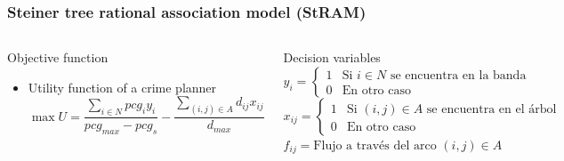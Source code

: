 \documentclass[aspectratio=169]{beamer}
\begin{document}
\begin{frame}
\frametitle{Steiner tree rational association model (StRAM)}
\begin{columns}
  \begin{block}{Objective function}
    \begin{itemize}
    \footnotesize
      \item Utility function of a crime planner
      \begin{equation*}
        \max U = \frac{\sum_{i \in N} pcg_i y_i}{pcg_{max} - pcg_s} - \frac{\sum_{(i,j) \in A} d_{ij} x_{ij}}{d_{max}}
      \end{equation*}
    \end{itemize}
  \end{block}
    \begin{block}{Decision variables}
    \footnotesize
      \vspace{1em}
      $y_{i} =
        \begin{cases}
          1 & \text{Si $i \in N$ se encuentra en la banda}\\
          0 & \text{En otro caso}
        \end{cases}$\\
      $x_{ij} =
        \begin{cases}
          1 & \text{Si $(i,j) \in A$ se encuentra en el árbol}\\
          0 & \text{En otro caso}
        \end{cases}$\\
      $f_{ij} = \text{Flujo a través del arco $(i,j) \in A$}$
    \end{block}
  \end{columns}
\end{frame}
\end{document}
